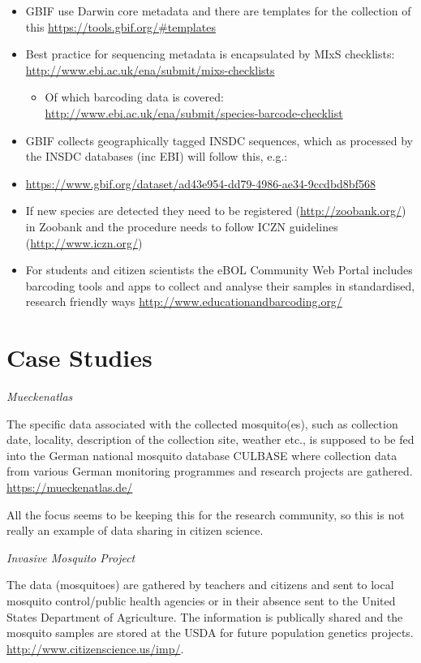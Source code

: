 \documentclass[]{article}
\providecommand{\tightlist}{%
  \setlength{\itemsep}{0pt}\setlength{\parskip}{0pt}}
\begin{document}
\begin{itemize}
\tightlist
\item
  GBIF use Darwin core metadata and there are templates for the collection of this \url{https://tools.gbif.org/\#templates}
\item
  Best practice for sequencing metadata is encapsulated by MIxS checklists: \url{http://www.ebi.ac.uk/ena/submit/mixs-checklists}

  \begin{itemize}
  \tightlist
  \item
    Of which barcoding data is covered: \url{http://www.ebi.ac.uk/ena/submit/species-barcode-checklist}
  \end{itemize}
\item
  GBIF collects geographically tagged INSDC sequences, which as processed by the INSDC databases (inc EBI) will follow this, e.g.:
\item
  \url{https://www.gbif.org/dataset/ad43e954-dd79-4986-ae34-9ccdbd8bf568}
\item
  If new species are detected they need to be registered (\url{http://zoobank.org/}) in Zoobank and the procedure needs to follow ICZN guidelines (\url{http://www.iczn.org/})
\item
  For students and citizen scientists the eBOL Community Web Portal includes barcoding tools and apps to collect and analyse their samples in standardised, research friendly ways \url{http://www.educationandbarcoding.org/}
\end{itemize}

\hypertarget{case-studies}{%
\section{Case Studies}\label{case-studies}}

\emph{Mueckenatlas}

The specific data associated with the collected mosquito(es), such as collection date, locality, description of the collection site, weather etc., is supposed to be fed into the German national mosquito database CULBASE where collection data from various German monitoring programmes and research projects are gathered.
\url{https://mueckenatlas.de/}

All the focus seems to be keeping this for the research community, so this is not really an example of data sharing in citizen science.

\emph{Invasive Mosquito Project}

The data (mosquitoes) are gathered by teachers and citizens and sent to local mosquito control/public health agencies or in their absence sent to the United States Department of Agriculture. The information is publically shared and the mosquito samples are stored at the USDA for future population genetics projects. \url{http://www.citizenscience.us/imp/}.
\end{document}
